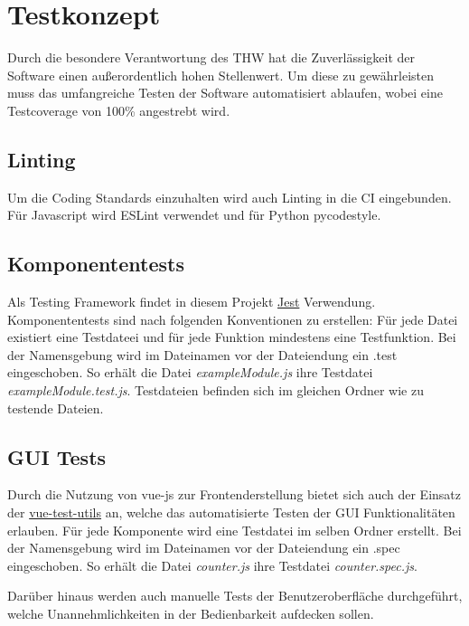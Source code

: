 \section{Testkonzept}
Durch die besondere Verantwortung des THW hat die Zuverlässigkeit der Software einen außerordentlich hohen Stellenwert. Um diese zu gewährleisten muss das umfangreiche Testen der Software automatisiert ablaufen, wobei eine Testcoverage von 100\% angestrebt wird.
\subsection{Linting}
Um die Coding Standards einzuhalten wird auch Linting in die CI eingebunden. Für Javascript wird
ESLint verwendet und für Python pycodestyle.
\subsection{Komponententests}
Als Testing Framework findet in diesem Projekt \href{https://facebook.github.io/jest/docs/en/getting-started.htmll}{Jest} Verwendung. Komponententests sind nach folgenden Konventionen zu erstellen: Für jede Datei existiert eine Testdateei und für jede Funktion mindestens eine Testfunktion. Bei der Namensgebung wird im Dateinamen vor der Dateiendung ein .test eingeschoben. So erhält die Datei \textit{exampleModule.js} ihre Testdatei \textit{exampleModule.test.js}. Testdateien befinden sich im gleichen Ordner wie zu testende Dateien.
\subsection{GUI Tests}
Durch die Nutzung von vue-js zur Frontenderstellung bietet sich auch der Einsatz der \href{https://vue-test-utils.vuejs.org/en/}{vue-test-utils} an, welche das automatisierte Testen der GUI Funktionalitäten erlauben. Für jede Komponente wird eine Testdatei im selben Ordner erstellt. Bei der Namensgebung wird im Dateinamen vor der Dateiendung ein .spec eingeschoben. So erhält die Datei \textit{counter.js} ihre Testdatei \textit{counter.spec.js}.

Darüber hinaus werden auch manuelle Tests der Benutzeroberfläche durchgeführt, welche Unannehmlichkeiten in der Bedienbarkeit aufdecken sollen.